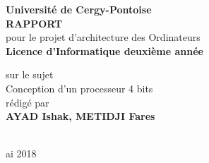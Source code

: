 
\begin{titlepage}{
    \begin{center}
        \vspace* {25mm}
        {\Large \textbf {Université de Cergy-Pontoise}} \\
        \vspace* {10mm}
        {\Large \textbf {RAPPORT}} \\
        \vspace* {10mm}
        pour le projet d'architecture des Ordinateurs \\
        \textbf {Licence d'Informatique deuxième année} \\
        \vspace* {10mm}

	sur le sujet \\
        \vspace* {10mm}
	{\Huge \textsf{Conception d'un processeur 4 bits}} \\
        \vspace* {10mm}
 	rédigé par \\
        \vspace* {10mm}
        {\Large \textbf {AYAD Ishak, METIDJI Fares}} \\
				\vspace* {10mm}
				 \\
        \date Mai 2018
        \vspace* {10mm}
	\end{center}
}
\end{titlepage}
